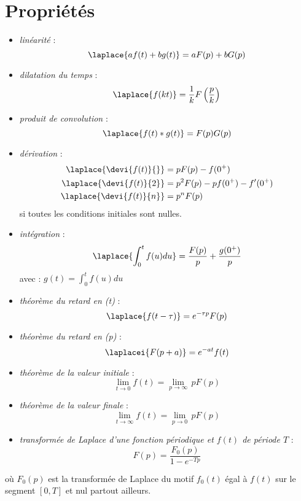 \section{Propriétés} 
\begin{itemize}
\item \emph{linéarité} :
$$ 
\laplace{af(t)+bg(t)} = aF(p) + bG(p)
$$ 
\item \emph{dilatation du temps} : 
$$
\laplace{f(kt)}=\dfrac{1}{k}F\left(\dfrac{p}{k}\right)
$$
\item \emph{produit de convolution} : 
$$
\laplace{f(t)*g(t)} = F(p)G(p)
$$
\item \emph{dérivation} : 
\begin{align*}
\laplace{\devi{f(t)}{}}&=pF(p) - f(0^+) \\
\laplace{\devi{f(t)}{2}}&=p^2F(p) - pf(0^+) - f'(0^+)\\
\laplace{\devi{f(t)}{n}}&=p^nF(p) 
\end{align*}
si toutes les conditions initiales sont nulles.
\item \emph{intégration} :
$$
\laplace{\int_0^t f(u)du} = \dfrac{F(p)}{p} + \dfrac{g(0^+)}{p}
$$
avec :
$g(t)=\int_0^t f(u)du$
\item \emph{théorème du retard en (t)} :
$$
\laplace{f(t-\tau)}=e^{-\tau p}F(p)
$$
\item \emph{théorème du retard en (p)} :
$$
\laplacei{F(p+a)}=e^{-at}f(t)
$$
\item \emph{théorème de la valeur initiale} :
$$
\lim\limits_{t \to 0} f(t)=\lim\limits_{p \to \infty}\, p F(p)
$$
\item \emph{théorème de la valeur finale} :
$$
\lim\limits_{t \to \infty} f(t)=\lim\limits_{p \to 0}\,p F(p)
$$
\item \emph{transformée de Laplace d'une fonction périodique et $f(t)$ de période $T$} :
$$
        F(p) = \dfrac{F_0(p)}{1-e^{-Tp}}
$$
\end{itemize}
où $F_0(p)$ est la transformée de Laplace du motif $f_0(t)$ égal à 
$f(t)$ sur le segment $[0,T]$ et nul partout ailleurs.

